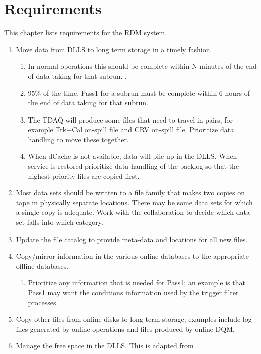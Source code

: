 \chapter{Requirements}

This chapter lists requirements for the RDM system.

\begin{enumerate}
\item Move data from DLLS to long term storage in a timely fashion.
  \begin{enumerate}
  \item In normal operations this should be complete within N minutes of the end of data taking for that subrun. .
  \item 95\% of the time, Pass1 for a subrun must be complete within 6 hours of the end of data taking for that subrun.
  \item The TDAQ will produce some files that need to travel in pairs, for example Trk+Cal on-spill file and CRV on-spill file.
    Prioritize data handling to move these together.
  \item When dCache is not available, data will pile up in the DLLS.  When service is restored prioritize data handling of the backlog
    so that the highest priority files are copied first.
  \end{enumerate}
\item Most data sets should be written to a file family that makes two copies on tape in physically separate locations.
  There may be some data sets for which a single copy is adequate.
  Work with the collaboration to decide which data set falls into which category.
\item Update the file catalog to provide meta-data and locations for all new files.
\item Copy/mirror information in the various online databases to the appropriate offline databases.
  \begin{enumerate}
  \item Prioritize any information that is needed for Pass1; an example is that Pass1 may want the conditions information
    used by the trigger filter processes.
  \end{enumerate}
\item Copy other files from online disks to long term storage; examples include log files generated by online
  operations and files produced by online DQM.
\item Manage the free space in the DLLS.  This is adapted from~\cite{OnlineMonitoring}.

\end{enumerate}
